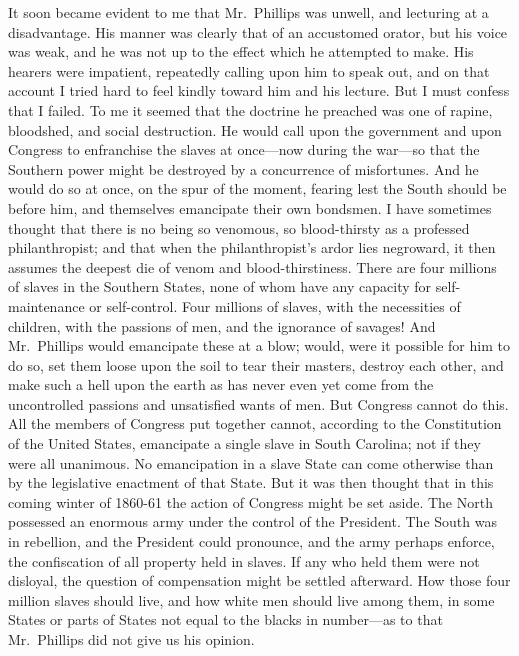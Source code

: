 It soon became evident to me that Mr.\ Phillips was unwell, and
lecturing at a disadvantage.  His manner was clearly that of an
accustomed orator, but his voice was weak, and he was not up to the
effect which he attempted to make.  His hearers were impatient,
repeatedly calling upon him to speak out, and on that account I
tried hard to feel kindly toward him and his lecture.  But I must
confess that I failed.  To me it seemed that the doctrine he
preached was one of rapine, bloodshed, and social destruction.  He
would call upon the government and upon Congress to enfranchise the
slaves at once---now during the war---so that the Southern power
might be destroyed by a concurrence of misfortunes.  And he would
do so at once, on the spur of the moment, fearing lest the South
should be before him, and themselves emancipate their own bondsmen.
I have sometimes thought that there is no being so venomous, so
blood-thirsty as a professed philanthropist; and that when the
philanthropist's ardor lies negroward, it then assumes the deepest
die of venom and blood-thirstiness.  There are four millions of
slaves in the Southern States, none of whom have any capacity for
self-maintenance or self-control.  Four millions of slaves, with
the necessities of children, with the passions of men, and the
ignorance of savages!  And Mr.\ Phillips would emancipate these at a
blow; would, were it possible for him to do so, set them loose upon
the soil to tear their masters, destroy each other, and make such a
hell upon the earth as has never even yet come from the
uncontrolled passions and unsatisfied wants of men.  But Congress
cannot do this.  All the members of Congress put together cannot,
according to the Constitution of the United States, emancipate a
single slave in South Carolina; not if they were all unanimous.  No
emancipation in a slave State can come otherwise than by the
legislative enactment of that State.  But it was then thought that
in this coming winter of 1860-61 the action of Congress might be
set aside.  The North possessed an enormous army under the control
of the President.  The South was in rebellion, and the President
could pronounce, and the army perhaps enforce, the confiscation of
all property held in slaves.  If any who held them were not
disloyal, the question of compensation might be settled afterward.
How those four million slaves should live, and how white men should
live among them, in some States or parts of States not equal to the
blacks in number---as to that Mr.\ Phillips did not give us his
opinion.

